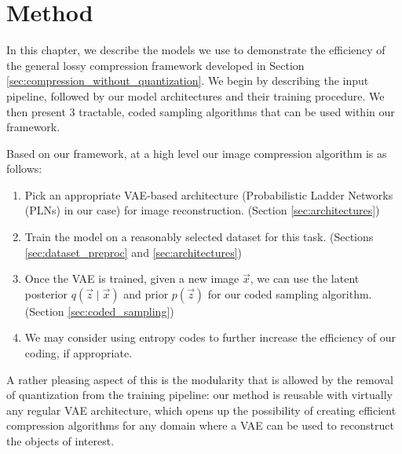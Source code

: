 
\chapter{Method}
\label{chapter:method}

\graphicspath{{../img/thesis/}{../img/plots/vae_latents/}{../img/related_works/}}

\par
In this chapter, we describe the models we use to demonstrate the efficiency of the
general lossy compression framework developed in Section
\ref{sec:compression_without_quantization}. We begin by describing the input
pipeline, followed by our model architectures and their training procedure. We
then present 3 tractable, coded sampling algorithms that can be used within our
framework.

Based on our framework, at a high level our image compression algorithm is as
follows:

\begin{framed}
\begin{enumerate}
\item Pick an appropriate VAE-based architecture (Probabilistic Ladder Networks
  (PLNs) in our case) for image reconstruction. (Section \ref{sec:architectures})

\item Train the model on a reasonably selected dataset for this task. (Sections
  \ref{sec:dataset_preproc} and \ref{sec:architectures})

\item Once the VAE is trained, given a new image
  $\vec{x}$, we can use the latent posterior $q(\vec{z} \mid \vec{x})$ and
  prior $p(\vec{z})$ for our coded sampling algorithm. (Section
  \ref{sec:coded_sampling})

\item We may consider using entropy codes to further increase the efficiency of
  our coding, if appropriate. 

\end{enumerate}
\end{framed}

\par
A rather pleasing aspect of this is the modularity that is allowed by the
removal of quantization from the training pipeline: our method is reusable with
virtually any regular VAE architecture, which opens up the possibility of
creating efficient compression algorithms for any domain where a VAE can be used
to reconstruct the objects of interest. 

